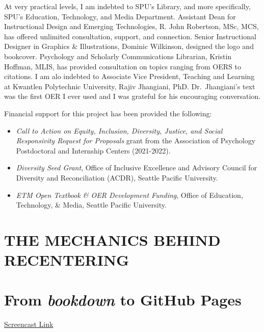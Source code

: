 \documentclass[
]{book}
\providecommand{\tightlist}{%
  \setlength{\itemsep}{0pt}\setlength{\parskip}{0pt}}
\begin{document}
At very practical levels, I am indebted to SPU's Library, and more specifically, SPU's Education, Technology, and Media Department. Assistant Dean for Instructional Design and Emerging Technologies, R. John Robertson, MSc, MCS, has offered unlimited consultation, support, and connection. Senior Instructional Designer in Graphics \& Illustrations, Dominic Wilkinson, designed the logo and bookcover. Psychology and Scholarly Communications Librarian, Kristin Hoffman, MLIS, has provided consultation on topics ranging from OERS to citations. I am alo indebted to Associate Vice President, Teaching and Learning at Kwantlen Polytechnic University, Rajiv Jhangiani, PhD. Dr.~Jhangiani's text \citeyearpar{jhangiani_research_2019} was the first OER I ever used and I was grateful for his encouraging conversation.

Financial support for this project has been provided the following:

\begin{itemize}
\tightlist
\item
  \emph{Call to Action on Equity, Inclusion, Diversity, Justice, and Social Responsivity Request for Proposals} grant from the Association of Psychology Postdoctoral and Internship Centers (2021-2022).
\item
  \emph{Diversity Seed Grant}, Office of Inclusive Excellence and Advisory Council for Diversity and Reconciliation (ACDR), Seattle Pacific University.
\item
  \emph{ETM Open Textbook \& OER Development Funding}, Office of Education, Technology, \& Media, Seattle Pacific University.
\end{itemize}

\hypertarget{the-mechanics-behind-recentering}{%
\chapter*{THE MECHANICS BEHIND RECENTERING}\label{the-mechanics-behind-recentering}}

\hypertarget{book1}{%
\chapter{\texorpdfstring{From \emph{bookdown} to GitHub Pages}{From bookdown to GitHub Pages}}\label{book1}}

\href{https://spu.hosted.panopto.com/Panopto/Pages/Viewer.aspx?pid=7c20cc56-069a-40e2-abc7-adf3017f8c47}{Screencast Link}
\end{document}
